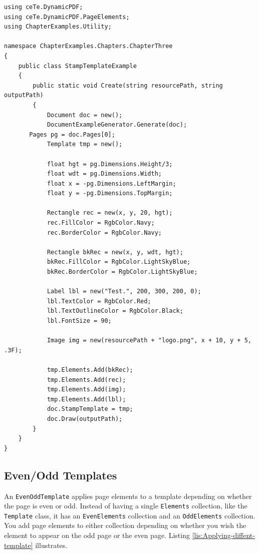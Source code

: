 \documentclass[american]{tufte-book}
\numberwithin{equation}{section}
\numberwithin{figure}{section}
\begin{document}
\bgroup{}
\begin{lstlisting}[caption={Using a stamp template.},label={lis:forground-Using-a-stamp},basicstyle={\footnotesize\ttfamily},breaklines=true]
using ceTe.DynamicPDF;
using ceTe.DynamicPDF.PageElements;
using ChapterExamples.Utility;

namespace ChapterExamples.Chapters.ChapterThree
{
    public class StampTemplateExample
    {
        public static void Create(string resourcePath, string outputPath)
        {
            Document doc = new();
            DocumentExampleGenerator.Generate(doc);
       Pages pg = doc.Pages[0];
            Template tmp = new();

            float hgt = pg.Dimensions.Height/3;
            float wdt = pg.Dimensions.Width;
            float x = -pg.Dimensions.LeftMargin;
            float y = -pg.Dimensions.TopMargin;

            Rectangle rec = new(x, y, 20, hgt);
            rec.FillColor = RgbColor.Navy;
            rec.BorderColor = RgbColor.Navy;

            Rectangle bkRec = new(x, y, wdt, hgt);
            bkRec.FillColor = RgbColor.LightSkyBlue;
            bkRec.BorderColor = RgbColor.LightSkyBlue;

            Label lbl = new("Test.", 200, 300, 200, 0);
            lbl.TextColor = RgbColor.Red;
            lbl.TextOutlineColor = RgbColor.Black;
            lbl.FontSize = 90;

            Image img = new(resourcePath + "logo.png", x + 10, y + 5, .3F);

            tmp.Elements.Add(bkRec);
            tmp.Elements.Add(rec);
            tmp.Elements.Add(img);
            tmp.Elements.Add(lbl);
            doc.StampTemplate = tmp;
            doc.Draw(outputPath);
        }
    }
}
\end{lstlisting}
\leavevmode\egroup


\subsection{Even/Odd Templates}

An \texttt{EvenOddTemplate} applies page elements to a template depending
on whether the page is even or odd. Instead of having a single \texttt{Elements}
collection, like the \texttt{Template} class, it has an \texttt{EvenElements}
collection and an \texttt{OddElements} collection. You add page elements
to either collection depending on whether you wish the element to
appear on the odd page or the even page. Listing \ref{lis:Applying-diffent-template}
illustrates.
\end{document}
